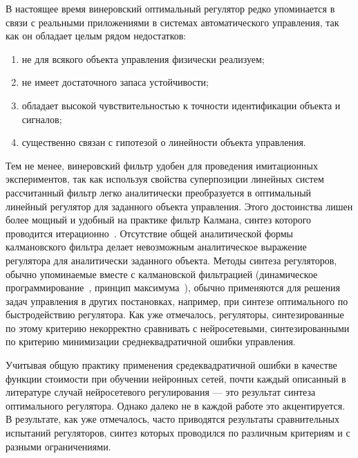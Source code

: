 В настоящее время винеровский оптимальный регулятор редко упоминается
в связи с реальными приложениями в системах автоматического
управления, так как он обладает целым рядом недостатков:

\begin{enumerate}

\item
не для всякого объекта управления физически реализуем;

\item
не имеет достаточного запаса устойчивости;

\item
обладает высокой чувствительностью к точности идентификации объекта и
сигналов;

\item
существенно связан с гипотезой о линейности объекта управления.

\end{enumerate}

Тем не менее, винеровский фильтр удобен для проведения имитационных
экспериментов, так как используя свойства суперпозиции линейных систем
рассчитанный фильтр легко аналитически преобразуется в оптимальный
линейный регулятор для заданного объекта управления.  Этого
достоинства лишен более мощный и удобный на практике фильтр Калмана,
синтез которого проводится
итерационно~\cite{bramziff82}\cite{ostrem73}.  Отсутствие общей
аналитической формы калмановского фильтра делает невозможным
аналитическое выражение регулятора для аналитически заданного объекта.
Методы синтеза регуляторов, обычно упоминаемые вместе с калмановской
фильтрацией (динамическое программирование~\cite{brisynho72}, принцип
максимума~\cite{leondes70}), обычно применяются для решения задач
управления в других постановках, например, при синтезе оптимального по
быстродействию регулятора.  Как уже отмечалось, регуляторы,
синтезированные по этому критерию некорректно сравнивать с
нейросетевыми, синтезированными по критерию минимизации
среднеквадратичной ошибки управления.

Учитывая общую практику применения средеквадратичной ошибки в качестве
функции стоимости при обучении нейронных сетей, почти каждый описанный
в литературе случай нейросетевого регулирования --- это результат
синтеза оптимального регулятора.  Однако далеко не в каждой работе это
акцентируется.  В результате, как уже отмечалось, часто приводятся
результаты сравнительных испытаний регуляторов, синтез которых
проводился по различным критериям и с разными ограничениями.

